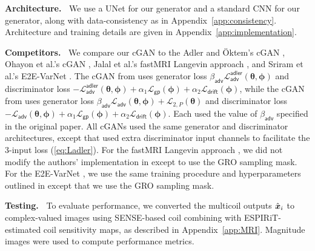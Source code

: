 \documentclass{article}
\theoremstyle{plain}
\theoremstyle{definition}
\theoremstyle{remark}
\newcommand{\hvec}[1]{\ensuremath{\Hat{\boldsymbol{#1}}}}
\renewcommand{\vec}[1]{\ensuremath{\boldsymbol{#1}}}
\newcommand{\mc}[1]{\ensuremath{\mathcal{#1}}}
\renewcommand{\eqref}[1]{(\ref{eq:#1})}
\newcommand{\appref}[1]{Appendix~\ref{app:#1}}
\newcommand{\Ladler}{\mc{L}^{\mathsf{adler}}_{\mathsf{adv}}}
\newcommand{\Ladv}{\mc{L}_{\mathsf{adv}}}
\newcommand{\Lgp}{\mc{L}_{\mathsf{gp}}}
\newcommand{\Ldrift}{\mc{L}_{\mathsf{drift}}}
\newcommand{\LtwoP}{\mc{L}_{2,P}}
\newcommand{\betaadv}{\beta_{\mathsf{adv}}}
\newcommand{\avgP}{_{\scriptscriptstyle (P)}}
\begin{document}
\textbf{Architecture.~} 
We use a UNet \cite{Ronneberger:MICCAI:15} for our generator and a standard CNN for our generator, along with data-consistency as in \appref{consistency}.
Architecture and training details are given in \appref{implementation}. 

\textbf{Competitors.~} 
We compare our cGAN to the Adler and \"Oktem's cGAN \cite{Adler:18}, Ohayon et al.'s cGAN \cite{Ohayon:ICCVW:21}, Jalal et al.'s fastMRI Langevin approach \cite{Jalal:NIPS:21}, and Sriram et al.'s E2E-VarNet \cite{Sriram:MICCAI:20}.
The cGAN from \cite{Adler:18} uses generator loss $\betaadv\Ladler(\vec{\theta},\vec{\phi})$ and discriminator loss $-\Ladler(\vec{\theta},\vec{\phi})+ \alpha_1 \Lgp(\vec{\phi}) + \alpha_2 \Ldrift(\vec{\phi})$, 
while the cGAN from \cite{Ohayon:ICCVW:21} uses generator loss $\betaadv\Ladv(\vec{\theta},\vec{\phi}) + \LtwoP(\vec{\theta})$ and discriminator loss $-\Ladv(\vec{\theta},\vec{\phi})+ \alpha_1 \Lgp(\vec{\phi}) + \alpha_2 \Ldrift(\vec{\phi})$.
Each used the value of $\betaadv$ specified in the original paper. 
All cGANs used the same generator and discriminator architectures, except that \cite{Adler:18} used extra discriminator input channels to facilitate the 3-input loss \eqref{Ladler}.
For the fastMRI Langevin approach \cite{Jalal:NIPS:21}, we did not modify the authors' implementation in \cite{Jalal:github:21} except to use the GRO sampling mask.
For the E2E-VarNet \cite{Sriram:MICCAI:20}, we use the same training procedure and hyperparameters outlined in \cite{Jalal:NIPS:21} except that we use the GRO sampling mask.

\textbf{Testing.~} 
To evaluate performance, we converted the multicoil outputs $\hvec{x}_i$ to complex-valued images using SENSE-based coil combining \cite{Prussmann:MRM:99} with ESPIRiT-estimated \cite{Uecker:MRM:14} coil sensitivity maps, as described in \appref{MRI}.
Magnitude images were used to compute performance metrics.

\end{document}
